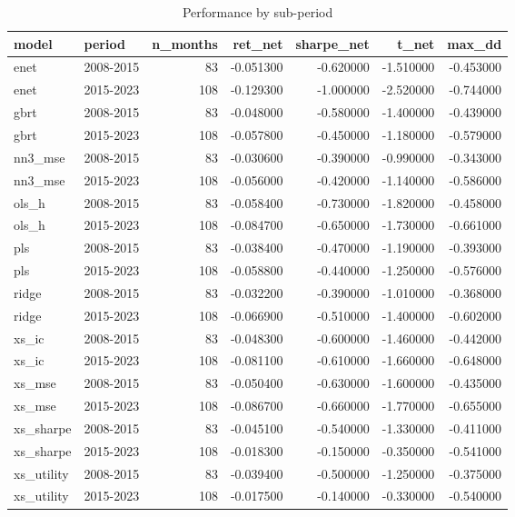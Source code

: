 \begin{table}
\caption{Performance by sub-period}
\label{tab:t6_subperiods}
\begin{tabular}{llrrrrr}
\toprule
model & period & n\_months & ret\_net & sharpe\_net & t\_net & max\_dd \\
\midrule
enet & 2008-2015 & 83 & -0.051300 & -0.620000 & -1.510000 & -0.453000 \\
enet & 2015-2023 & 108 & -0.129300 & -1.000000 & -2.520000 & -0.744000 \\
gbrt & 2008-2015 & 83 & -0.048000 & -0.580000 & -1.400000 & -0.439000 \\
gbrt & 2015-2023 & 108 & -0.057800 & -0.450000 & -1.180000 & -0.579000 \\
nn3\_mse & 2008-2015 & 83 & -0.030600 & -0.390000 & -0.990000 & -0.343000 \\
nn3\_mse & 2015-2023 & 108 & -0.056000 & -0.420000 & -1.140000 & -0.586000 \\
ols\_h & 2008-2015 & 83 & -0.058400 & -0.730000 & -1.820000 & -0.458000 \\
ols\_h & 2015-2023 & 108 & -0.084700 & -0.650000 & -1.730000 & -0.661000 \\
pls & 2008-2015 & 83 & -0.038400 & -0.470000 & -1.190000 & -0.393000 \\
pls & 2015-2023 & 108 & -0.058800 & -0.440000 & -1.250000 & -0.576000 \\
ridge & 2008-2015 & 83 & -0.032200 & -0.390000 & -1.010000 & -0.368000 \\
ridge & 2015-2023 & 108 & -0.066900 & -0.510000 & -1.400000 & -0.602000 \\
xs\_ic & 2008-2015 & 83 & -0.048300 & -0.600000 & -1.460000 & -0.442000 \\
xs\_ic & 2015-2023 & 108 & -0.081100 & -0.610000 & -1.660000 & -0.648000 \\
xs\_mse & 2008-2015 & 83 & -0.050400 & -0.630000 & -1.600000 & -0.435000 \\
xs\_mse & 2015-2023 & 108 & -0.086700 & -0.660000 & -1.770000 & -0.655000 \\
xs\_sharpe & 2008-2015 & 83 & -0.045100 & -0.540000 & -1.330000 & -0.411000 \\
xs\_sharpe & 2015-2023 & 108 & -0.018300 & -0.150000 & -0.350000 & -0.541000 \\
xs\_utility & 2008-2015 & 83 & -0.039400 & -0.500000 & -1.250000 & -0.375000 \\
xs\_utility & 2015-2023 & 108 & -0.017500 & -0.140000 & -0.330000 & -0.540000 \\
\bottomrule
\end{tabular}
\end{table}
